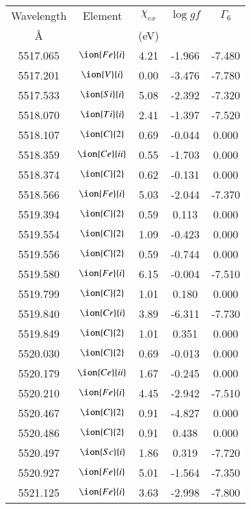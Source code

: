 \documentclass[fleqn,usenatbib]{mnras}
\begin{document}
\begin{center}
 \begin{table}
 \begin{tabular}{ccccc}
 \hline
 Wavelength & Element & $\chi_{ex}$ &  $\log gf$ & $\varGamma_{6}$ \\
   \AA{}    &         &  (eV)       &            &                  \\
 \hline
5517.065 &  $\ion{Fe}{i}$  & 4.21 & -1.966 & -7.480 \\ 
5517.201 &  $\ion{V}{i}$  & 0.00 & -3.476 & -7.780 \\ 
5517.533 &  $\ion{Si}{i}$  & 5.08 & -2.392 & -7.320 \\ 
5518.070 &  $\ion{Ti}{i}$  & 2.41 & -1.397 & -7.520 \\ 
5518.107 &  $\ion{C}{2}$ & 0.69 & -0.044 & 0.000 \\ 
5518.359 &  $\ion{Ce}{ii}$  & 0.55 & -1.703 & 0.000 \\ 
5518.374 &  $\ion{C}{2}$ & 0.62 & -0.131 & 0.000 \\ 
5518.566 &  $\ion{Fe}{i}$  & 5.03 & -2.044 & -7.370 \\ 
5519.394 &  $\ion{C}{2}$ & 0.59 & 0.113 & 0.000 \\ 
5519.554 &  $\ion{C}{2}$ & 1.09 & -0.423 & 0.000 \\ 
5519.556 &  $\ion{C}{2}$ & 0.59 & -0.744 & 0.000 \\ 
5519.580 &  $\ion{Fe}{i}$  & 6.15 & -0.004 & -7.510 \\ 
5519.799 &  $\ion{C}{2}$ & 1.01 & 0.180 & 0.000 \\ 
5519.840 &  $\ion{Cr}{i}$  & 3.89 & -6.311 & -7.730 \\ 
5519.849 &  $\ion{C}{2}$ & 1.01 & 0.351 & 0.000 \\ 
5520.030 &  $\ion{C}{2}$ & 0.69 & -0.013 & 0.000 \\ 
5520.179 &  $\ion{Ce}{ii}$  & 1.67 & -0.245 & 0.000 \\ 
5520.210 &  $\ion{Fe}{i}$  & 4.45 & -2.942 & -7.510 \\ 
5520.467 &  $\ion{C}{2}$ & 0.91 & -4.827 & 0.000 \\ 
5520.486 &  $\ion{C}{2}$ & 0.91 & 0.438 & 0.000 \\ 
5520.497 &  $\ion{Sc}{i}$  & 1.86 & 0.319 & -7.720 \\ 
5520.927 &  $\ion{Fe}{i}$  & 5.01 & -1.564 & -7.350 \\ 
5521.125 &  $\ion{Fe}{i}$  & 3.63 & -2.998 & -7.800 \\ 

\end{tabular}
\end{table}
\end{center}
\end{document}

